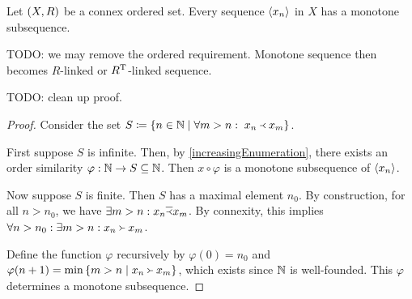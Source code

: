 \begin{proposition} \label{existenceMonotoneSubsequenceConnexRelation}
Let $\sSet{X,R}$ be a connex ordered set. Every sequence $\left\langle x_n \right\rangle$ in $X$ has a monotone subsequence.
\end{proposition}
TODO: we may remove the ordered requirement. Monotone sequence then becomes $R$-linked or $R^{\mathrm{T}}$-linked sequence.

TODO: clean up proof.
\begin{proof}
Consider the set $S\defeq \setbuilder{n\in \N}{\forall m > n: \; x_n \Yleft x_m}$.

First suppose $S$ is infinite. Then, by \ref{increasingEnumeration}, there exists an order similarity $\varphi: \mathbb{N} \to S \subseteq \mathbb{N}$. Then $x\circ \varphi$ is a monotone subsequence of $\left\langle x_n \right\rangle$.

Now suppose $S$ is finite. Then $S$ has a maximal element $n_0$. By construction, for all $n>n_0$, we have $\exists m > n: x_n \overline{\Yleft} x_m$. By connexity, this implies $\forall n>n_0: \exists m > n: x_n \Yright x_m$.

Define the function $\varphi$ recursively by $\varphi(0) = n_0$ and $\varphi(n+1) = \min\setbuilder{m>n}{x_n \Yright x_m}$, which exists since $\mathbb{N}$ is well-founded. This $\varphi$ determines a monotone subsequence.
\end{proof}

